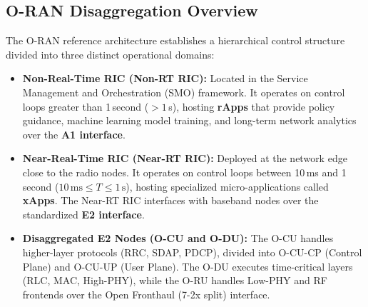 \documentclass[11pt,a4paper]{article}
\begin{document}
\subsection{O-RAN Disaggregation Overview}

The O-RAN reference architecture establishes a hierarchical control structure divided into three distinct operational domains:
\begin{itemize}
  \item \textbf{Non-Real-Time RIC (Non-RT RIC):} Located in the Service Management and Orchestration (SMO) framework. It operates on control loops greater than 1\,second ($>1$\,s), hosting \textbf{rApps} that provide policy guidance, machine learning model training, and long-term network analytics over the \textbf{A1 interface}.
  \item \textbf{Near-Real-Time RIC (Near-RT RIC):} Deployed at the network edge close to the radio nodes. It operates on control loops between 10\,ms and 1\,second ($10\,\text{ms} \le T \le 1\,\text{s}$), hosting specialized micro-applications called \textbf{xApps}. The Near-RT RIC interfaces with baseband nodes over the standardized \textbf{E2 interface}.
  \item \textbf{Disaggregated E2 Nodes (O-CU and O-DU):} The O-CU handles higher-layer protocols (RRC, SDAP, PDCP), divided into O-CU-CP (Control Plane) and O-CU-UP (User Plane). The O-DU executes time-critical layers (RLC, MAC, High-PHY), while the O-RU handles Low-PHY and RF frontends over the Open Fronthaul (7-2x split) interface.
\end{itemize}
\end{document}
